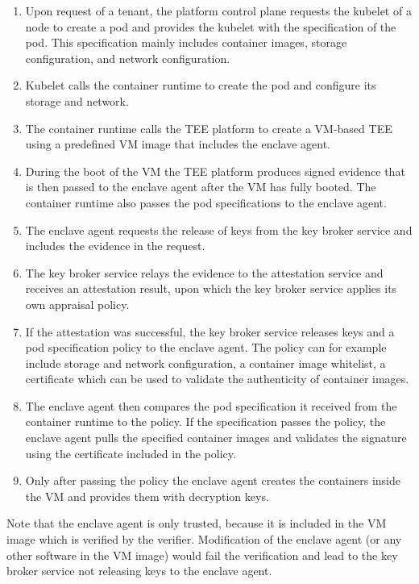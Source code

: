 \begin{enumerate}
  \item Upon request of a tenant, the platform control plane requests the
        kubelet of a node to create a pod and provides the kubelet with the
        specification of the pod. This specification mainly includes container
        images, storage configuration, and network configuration.
  \item Kubelet calls the container runtime to create the pod and configure its
        storage and network.
  \item The container runtime calls the TEE platform to create a VM-based TEE
        using a predefined VM image that includes the enclave agent.
  \item During the boot of the VM the TEE platform produces signed evidence that
        is then passed to the enclave agent after the VM has fully booted. The
        container runtime also passes the pod specifications to the enclave
        agent.
  \item The enclave agent requests the release of keys from the key broker
        service and includes the evidence in the request.
  \item The key broker service relays the evidence to the attestation service
        and receives an attestation result, upon which the key broker service
        applies its own appraisal policy.
  \item If the attestation was successful, the key broker service releases keys
        and a pod specification policy to the enclave agent. The policy can for
        example include storage and network configuration, a container image
        whitelist, a certificate which can be used to validate the authenticity
        of container images.
  \item The enclave agent then compares the pod specification it received from
        the container runtime to the policy. If the specification passes the
        policy, the enclave agent pulls the specified container images and
        validates the signature using the certificate included in the policy.
  \item Only after passing the policy the enclave agent creates the containers
        inside the VM and provides them with decryption keys.
\end{enumerate}

Note that the enclave agent is only trusted, because it is included in the VM
image which is verified by the verifier. Modification of the enclave agent (or
any other software in the VM image) would fail the verification and lead to the
key broker service not releasing keys to the enclave agent.

